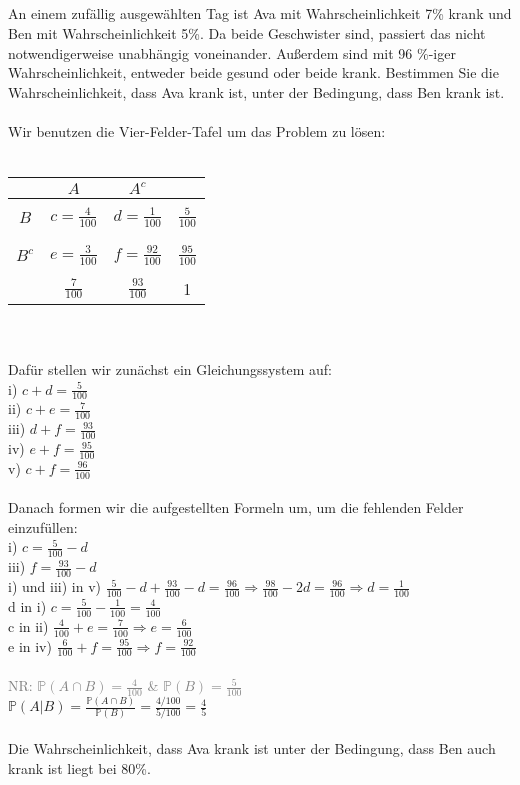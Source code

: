 \documentclass[a4paper]{article}
\begin{document}
\subsection{}
An einem zufällig ausgewählten Tag ist Ava mit Wahrscheinlichkeit 7\% krank und Ben mit Wahrscheinlichkeit 5\%. Da beide Geschwister sind, passiert das nicht notwendigerweise unabhängig voneinander. Außerdem sind mit 96 \%-iger Wahrscheinlichkeit, entweder beide gesund oder beide krank. Bestimmen Sie die Wahrscheinlichkeit, dass Ava krank ist, unter der Bedingung, dass Ben krank ist.\\\\
Wir benutzen die Vier-Felder-Tafel um das Problem zu lösen:\\\\
\begin{tabular}{c|c|c|c}
     & $A$ & $A^c$ \\
    \hline
    & & & \\
    $B$ & $c=\frac{4}{100}$ & $d=\frac{1}{100}$ & $\frac{5}{100}$\\
    & & & \\
    \hline
    & & & \\
    $B^c$ & $e=\frac{3}{100}$ & $f=\frac{92}{100}$ & $\frac{95}{100}$\\
    & & & \\
    \hline
    & $\frac{7}{100}$ & $\frac{93}{100}$ & 1
\end{tabular}\\\\
Dafür stellen wir zunächst ein Gleichungssystem auf:\\
i) \space\space\(c+d=\frac{5}{100}\)\\
ii) \space\(c+e=\frac{7}{100}\)\\
iii) \(d+f=\frac{93}{100}\)\\
iv) \(e+f=\frac{95}{100}\)\\
v) \space \(c+f=\frac{96}{100}\)\\\\
Danach formen wir die aufgestellten Formeln um, um die fehlenden Felder einzufüllen:\\
i) $c= \frac{5}{100}-d$\\
iii) $f = \frac{93}{100}-d$\\
i) und iii) in v) $\frac{5}{100}-d + \frac{93}{100}-d = \frac{96}{100} \Rightarrow \frac{98}{100}-2d = \frac{96}{100} \Rightarrow d=\frac{1}{100}$\\
d in i) $c = \frac{5}{100}-\frac{1}{100}=\frac{4}{100}$\\
c in ii) $\frac{4}{100}+e=\frac{7}{100}\Rightarrow e=\frac{6}{100}$\\
e in iv) $\frac{6}{100}+f=\frac{95}{100}\Rightarrow f = \frac{92}{100}$\\\\
\textcolor{gray}{NR: \(\mathbb{P}(A \cap B)=\frac{4}{100}\) \& \(\mathbb{P}(B)= \frac{5}{100}\)}\\
$\mathbb{P}(A \vert B) = \frac{\mathbb{P}(A \cap B)}{\mathbb{P}(B)}= \frac{4/100}{5/100}=\frac{4}{5}$\\\\
Die Wahrscheinlichkeit, dass Ava krank ist unter der Bedingung, dass Ben auch krank ist liegt bei 80\%.
\clearpage
\end{document}

